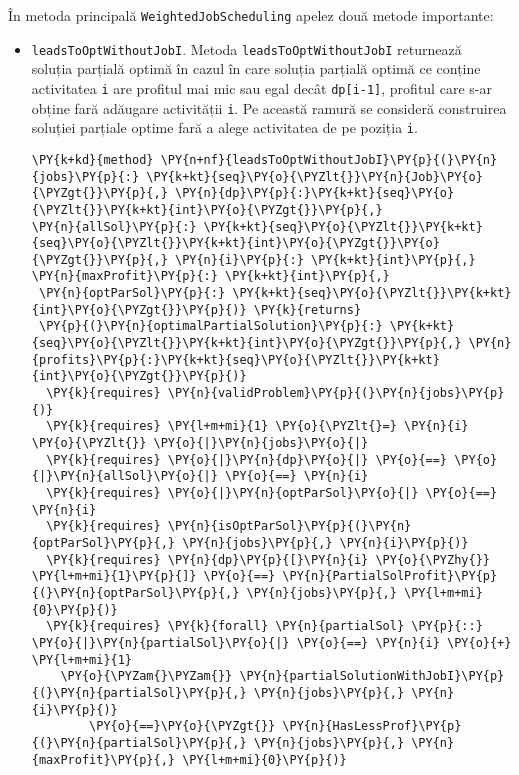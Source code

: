 În metoda principală \texttt{WeightedJobScheduling} apelez două metode importante:
\begin{itemize}
    \item\texttt{leadsToOptWithoutJobI}. Metoda \texttt{leadsToOptWithoutJobI} returnează \\soluția parțială optimă în cazul în care soluția parțială optimă ce conține activitatea \texttt{i}
    are profitul mai mic sau egal decât \texttt{dp[i-1]}, profitul care s-ar obține fară adăugare activității \texttt{i}. Pe această ramură se consideră construirea soluției parțiale optime fară a alege activitatea de pe poziția \texttt{i}.
    \begin{Verbatim}[commandchars=\\\{\},fontsize=\footnotesize]
\PY{k+kd}{method} \PY{n+nf}{leadsToOptWithoutJobI}\PY{p}{(}\PY{n}{jobs}\PY{p}{:} \PY{k+kt}{seq}\PY{o}{\PYZlt{}}\PY{n}{Job}\PY{o}{\PYZgt{}}\PY{p}{,} \PY{n}{dp}\PY{p}{:}\PY{k+kt}{seq}\PY{o}{\PYZlt{}}\PY{k+kt}{int}\PY{o}{\PYZgt{}}\PY{p}{,} 
\PY{n}{allSol}\PY{p}{:} \PY{k+kt}{seq}\PY{o}{\PYZlt{}}\PY{k+kt}{seq}\PY{o}{\PYZlt{}}\PY{k+kt}{int}\PY{o}{\PYZgt{}}\PY{o}{\PYZgt{}}\PY{p}{,} \PY{n}{i}\PY{p}{:} \PY{k+kt}{int}\PY{p}{,} \PY{n}{maxProfit}\PY{p}{:} \PY{k+kt}{int}\PY{p}{,}
 \PY{n}{optParSol}\PY{p}{:} \PY{k+kt}{seq}\PY{o}{\PYZlt{}}\PY{k+kt}{int}\PY{o}{\PYZgt{}}\PY{p}{)} \PY{k}{returns}
 \PY{p}{(}\PY{n}{optimalPartialSolution}\PY{p}{:} \PY{k+kt}{seq}\PY{o}{\PYZlt{}}\PY{k+kt}{int}\PY{o}{\PYZgt{}}\PY{p}{,} \PY{n}{profits}\PY{p}{:}\PY{k+kt}{seq}\PY{o}{\PYZlt{}}\PY{k+kt}{int}\PY{o}{\PYZgt{}}\PY{p}{)}
  \PY{k}{requires} \PY{n}{validProblem}\PY{p}{(}\PY{n}{jobs}\PY{p}{)}
  \PY{k}{requires} \PY{l+m+mi}{1} \PY{o}{\PYZlt{}=} \PY{n}{i} \PY{o}{\PYZlt{}} \PY{o}{|}\PY{n}{jobs}\PY{o}{|}
  \PY{k}{requires} \PY{o}{|}\PY{n}{dp}\PY{o}{|} \PY{o}{==} \PY{o}{|}\PY{n}{allSol}\PY{o}{|} \PY{o}{==} \PY{n}{i}
  \PY{k}{requires} \PY{o}{|}\PY{n}{optParSol}\PY{o}{|} \PY{o}{==} \PY{n}{i}
  \PY{k}{requires} \PY{n}{isOptParSol}\PY{p}{(}\PY{n}{optParSol}\PY{p}{,} \PY{n}{jobs}\PY{p}{,} \PY{n}{i}\PY{p}{)}
  \PY{k}{requires} \PY{n}{dp}\PY{p}{[}\PY{n}{i} \PY{o}{\PYZhy{}} \PY{l+m+mi}{1}\PY{p}{]} \PY{o}{==} \PY{n}{PartialSolProfit}\PY{p}{(}\PY{n}{optParSol}\PY{p}{,} \PY{n}{jobs}\PY{p}{,} \PY{l+m+mi}{0}\PY{p}{)}
  \PY{k}{requires} \PY{k}{forall} \PY{n}{partialSol} \PY{p}{::} \PY{o}{|}\PY{n}{partialSol}\PY{o}{|} \PY{o}{==} \PY{n}{i} \PY{o}{+} \PY{l+m+mi}{1}
    \PY{o}{\PYZam{}\PYZam{}} \PY{n}{partialSolutionWithJobI}\PY{p}{(}\PY{n}{partialSol}\PY{p}{,} \PY{n}{jobs}\PY{p}{,} \PY{n}{i}\PY{p}{)} 
        \PY{o}{==}\PY{o}{\PYZgt{}} \PY{n}{HasLessProf}\PY{p}{(}\PY{n}{partialSol}\PY{p}{,} \PY{n}{jobs}\PY{p}{,} \PY{n}{maxProfit}\PY{p}{,} \PY{l+m+mi}{0}\PY{p}{)}

\end{Verbatim}
\end{itemize}
